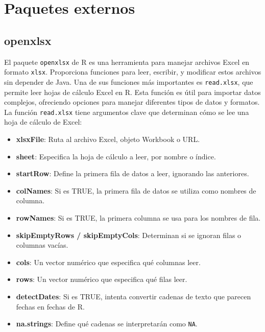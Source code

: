\documentclass[12pt]{report}\usepackage[]{graphicx}\usepackage[dvipsnames]{xcolor}
\begin{document}
 	
 	\chapter{Paquetes externos}\label{App:PaquetesExternos}
 	
 	\section{openxlsx}
 	
 	El paquete \texttt{openxlsx} de R es una herramienta para manejar archivos Excel en formato \texttt{xlsx}. Proporciona funciones para leer, escribir, y modificar estos archivos sin depender de Java. Una de sus funciones más importantes es \texttt{read.xlsx}, que permite leer hojas de cálculo Excel en R. Esta función es útil para importar datos complejos, ofreciendo opciones para manejar diferentes tipos de datos y formatos.\\
 	
 	La función \texttt{read.xlsx} tiene argumentos clave que determinan cómo se lee una hoja de cálculo de Excel:
 	
 	\begin{itemize}
 		\item \textbf{xlsxFile}: Ruta al archivo Excel, objeto Workbook o URL.
 		\item \textbf{sheet}: Especifica la hoja de cálculo a leer, por nombre o índice.
 		\item \textbf{startRow}: Define la primera fila de datos a leer, ignorando las anteriores.
 		\item \textbf{colNames}: Si es TRUE, la primera fila de datos se utiliza como nombres de columna.
 		\item \textbf{rowNames}: Si es TRUE, la primera columna se usa para los nombres de fila.
 		\item \textbf{skipEmptyRows / skipEmptyCols}: Determinan si se ignoran filas o columnas vacías.
 		\item \textbf{cols}: Un vector numérico que especifica qué columnas leer.
 		\item \textbf{rows}: Un vector numérico que especifica qué filas leer.
 		\item \textbf{detectDates}: Si es TRUE, intenta convertir cadenas de texto que parecen fechas en fechas de R.
 		\item \textbf{na.strings}: Define qué cadenas se interpretarán como \texttt{NA}.
 	\end{itemize}
 	
\end{document}
